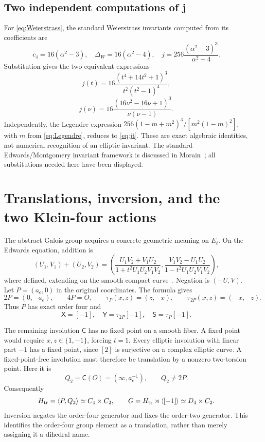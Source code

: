 \subsection{Two independent computations of j}
For \eqref{eq:Weierstrass}, the standard Weierstrass invariants computed from its coefficients are
\[
c_4=16(\alpha^2-3),\quad\Delta_W=16(\alpha^2-4),\quad
j=256\frac{(\alpha^2-3)^3}{\alpha^2-4}.
\]
Substitution gives the two equivalent expressions
\begin{equation}\label{eq:jt}
j(t)=16\frac{(t^4+14t^2+1)^3}{t^2(t^2-1)^4},
\end{equation}
\begin{equation}\label{eq:jnu}
j(\nu)=16\frac{(16\nu^2-16\nu+1)^3}{\nu(\nu-1)}.
\end{equation}
Independently, the Legendre expression
\(256(1-m+m^2)^3/[m^2(1-m)^2]\), with \(m\) from \eqref{eq:Legendre}, reduces to \eqref{eq:jt}. These are exact algebraic identities, not numerical recognition of an elliptic invariant. The standard Edwards/Montgomery invariant framework is discussed in Morain~\cite[\S\S2.4--2.5]{Morain}; all substitutions needed here have been displayed.

\section{Translations, inversion, and the two Klein-four actions}\label{sec:group}

The abstract Galois group acquires a concrete geometric meaning on \(E_t\). On the Edwards equation, addition is
\[
(U_1,V_1)+(U_2,V_2)=
\left(\frac{U_1V_2+V_1U_2}{1+t^2U_1U_2V_1V_2},
\frac{V_1V_2-U_1U_2}{1-t^2U_1U_2V_1V_2}\right),
\]
where defined, extending on the smooth compact curve~\cite{EFD}. Negation is \((-U,V)\). Let \(P=(a_e,0)\) in the original coordinates. The formula gives
\[
2P=(0,-a_e),\qquad4P=O,\qquad
\tau_P(x,z)=(z,-x),\qquad\tau_{2P}(x,z)=(-x,-z).
\]
Thus \(P\) has exact order four and
\begin{equation}\label{eq:translationactions}
\mathsf X=[-1],\quad
\mathsf Y=\tau_{2P}[-1],\quad
\mathsf S=\tau_P[-1].
\end{equation}

The remaining involution \(\mathsf C\) has no fixed point on a smooth fiber. A fixed point would require \(x,z\in\{1,-1\}\), forcing \(t=1\). Every elliptic involution with linear part \(-1\) has a fixed point, since \([2]\) is surjective on a complex elliptic curve. A fixed-point-free involution must therefore be translation by a nonzero two-torsion point. Here it is
\[
Q_2=\mathsf C(O)=(\infty,a_e^{-1}),\qquad Q_2\ne2P.
\]
Consequently
\begin{equation}\label{eq:Gelliptic}
H_{\rm tr}=\langle P,Q_2\rangle\simeq C_4\times C_2,
\qquad G=H_{\rm tr}\rtimes\langle[-1]\rangle\simeq D_4\times C_2.
\end{equation}
Inversion negates the order-four generator and fixes the order-two generator. This identifies the order-four group element as a translation, rather than merely assigning it a dihedral name.

